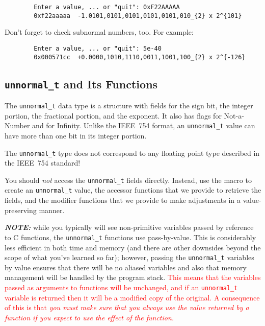 \begin{verbatim}
        Enter a value, ... or "quit": 0xF22AAAAA
        0xf22aaaaa	-1.0101,0101,0101,0101,0101,010_{2} x 2^{101}
\end{verbatim}

Don't forget to check subnormal numbers, too.
For example:

\begin{verbatim}
        Enter a value, ... or "quit": 5e-40
        0x000571cc	+0.0000,1010,1110,0011,1001,100_{2} x 2^{-126}
\end{verbatim}

\subsection{\texttt{unnormal\_t} and Its Functions} \label{subsec:unnormal}

The \lstinline{unnormal_t} data type is a structure with fields for the sign bit, the integer portion, the fractional portion, and the exponent.
It also has flags for Not-a-Number and for Infinity.
Unlike the IEEE~754 format, an \lstinline{unnormal_t} value can have more than one bit in its integer portion.

\hspace{-2cm}\colorbox{red!25}{The \lstinline{unnormal_t} type does not correspond to any floating point type described in the IEEE~754 standard!}

You should \textit{not} access the \lstinline{unnormal_t} fields directly.
Instead, use the  macro to create an \lstinline{unnormal_t} value, the accessor functions that we provide to retrieve the fields, and the modifier functions that we provide to make adjustments in a value-preserving manner.

\textit{\textbf{NOTE:}} while you typically will see non-primitive variables passed by reference to C functions, the \lstinline{unnormal_t} functions use pass-by-value.
This is considerably less efficient in both time and memory (and there are other downsides beyond the scope of what you've learned so far);
however, passing the \lstinline{unnormal_t} variables by value ensures that there will be no aliased variables and also that memory management will be handled by the program stack.
\textcolor{red}{This means that the variables passed as arguments to functions will be unchanged, and if an \lstinline{unnormal_t} variable is returned then it will be a modified copy of the original.
A consequence of this is that \textit{you must make sure that you always use the value returned by a function if you expect to use the effect of the function.}}

